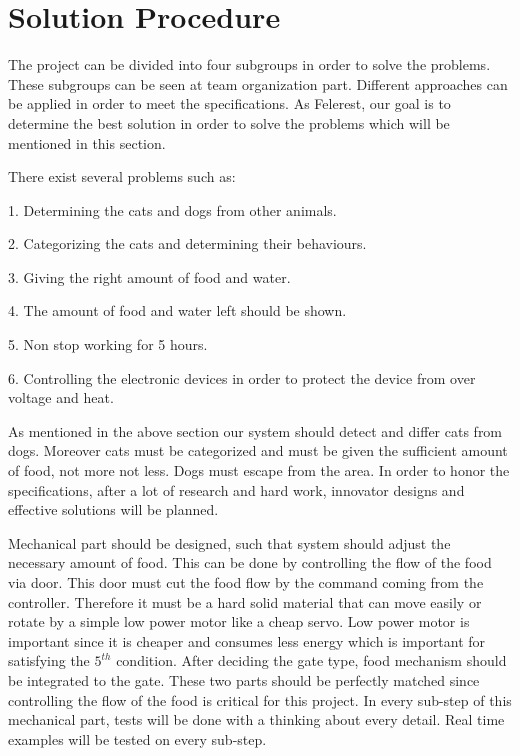 \section{Solution Procedure} \label{sec:sol_proc}


The project can be divided into four subgroups in order to solve the problems. These subgroups can be seen at team organization part. Different approaches can be applied in order to meet the specifications. As Felerest, our goal is to determine the best solution in order to solve the problems which will be mentioned in this section. 

There exist several problems such as:

1. Determining the cats and dogs from other animals.

2. Categorizing the cats and determining their behaviours. 

3. Giving the right amount of food and water.

4. The amount of food and water left should be shown.

5. Non stop working for 5 hours.

6. Controlling the electronic devices in order to protect the device from over voltage and heat. 

As mentioned in the above section our system should detect and differ cats from dogs. Moreover cats must be categorized and must be given the sufficient amount of food, not more not less. Dogs must escape from the area. In order to honor the specifications, after a lot of research and hard work, innovator designs and effective solutions will be planned.

Mechanical part should be designed, such that system should adjust the necessary amount of food. This can be done by controlling the flow of the food via door. This door must cut the food flow by the command coming from the controller. Therefore it must be a hard solid material that can move easily or rotate by a simple low power motor like a cheap servo\cite{cite:cheapservo}. Low power motor is important since it is cheaper and consumes less energy which is important for satisfying the \(5^{th}\) condition. After deciding the gate type, food mechanism should be integrated to the gate. These two parts should be perfectly matched since controlling the flow of the food is critical for this project. In every sub-step of this mechanical part, tests will be done with a thinking about every detail. Real time examples will be tested on every sub-step.  

